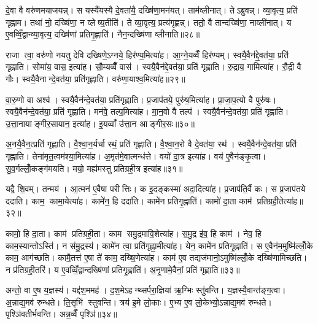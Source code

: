 दे॒वा वै वरु॑णमयाजयन्न्। स यस्यै॑यस्यै दे॒वता॑यै॒ दख्षि॑णा॒मन॑यत्। ताम॑व्लीनात्। तेऽब्रुवन्न्। व्या॒वृत्य॒ प्रति॑ गृह्णाम। तथा॑ नो॒ दख्षि॑णा॒ न व्लेष्य॒तीति॑। ते व्या॒वृत्य॒ प्रत्य॑गृह्णन्न्। ततो॒ वै तान्दख्षि॑णा॒ नाव्ली॑नात्। य ए॒वव्विँ॒द्वान्व्या॒वृत्य॒ दख्षि॑णां प्रतिगृ॒ह्णाति॑। नैन॒न्दख्षि॑णा व्लीनाति॥२८॥

राजा त्वा॒ वरु॑णो नयतु देवि दख्षिणे॒ऽग्नये॒ हिर॑ण्य॒मित्या॑ह। आ॒ग्ने॒यव्वैँ हिर॑ण्यम्। स्वयै॒वैन॑द्दे॒वत॑या॒ प्रति॑ गृह्णाति। सोमा॑य॒ वास॒ इत्या॑ह। सौ॒म्यव्वैँ वास॑। स्वयै॒वैन॑द्दे॒वत॑या॒ प्रति॑ गृह्णाति। रु॒द्राय॒ गामित्या॑ह। रौ॒द्री वै गौः। स्वयै॒वैनान्दे॒वत॑या॒ प्रति॑गृह्णाति। वरु॑णा॒याश्व॒मित्या॑ह॥२९॥

वा॒रु॒णो वा अश्व॑। स्वयै॒वैन॑न्दे॒वत॑या॒ प्रति॑गृह्णाति। प्र॒जाप॑तये॒ पुरु॑ष॒मित्या॑ह। प्रा॒जा॒प॒त्यो वै पुरु॑षः। स्वयै॒वैन॑न्दे॒वत॑या॒ प्रति॑ गृह्णाति। मन॑वे॒ तल्प॒मित्या॑ह। मा॒न॒वो वै तल्प॑। स्वयै॒वैन॑न्दे॒वत॑या॒ प्रति॑ गृह्णाति। उ॒त्ता॒नायाङ्गीर॒सायान॒ इत्या॑ह। इ॒यव्वाँ उ॑त्ता॒न आङ्गीर॒सः॥३०॥

अ॒नयै॒वैन॒त्प्रति॑ गृह्णाति। वै॒श्वा॒न॒र्यर्चा रथं॒ प्रति॑ गृह्णाति। वै॒श्वा॒न॒रो वै दे॒वत॑या॒ रथ॑। स्वयै॒वैन॑न्दे॒वत॑या॒ प्रति॑ गृह्णाति। तेना॑मृत॒त्वम॑श्या॒मित्या॑ह। अ॒मृत॑मे॒वात्मन्ध॑त्ते। वयो॑ दा॒त्र इत्या॑ह। वय॑ ए॒वैन॑ङ्कृ॒त्वा। सु॒व॒र्गल्लोँ॒कङ्ग॑मयति। मयो॒ मह्य॑मस्तु प्रतिग्रही॒त्र इत्या॑ह॥३१॥

यद्वै शि॒वम्। तन्मय॑। आ॒त्मन॑ ए॒वैषा परीत्तिः। क इ॒दङ्कस्मा॑ अदा॒दित्या॑ह। प्र॒जाप॑ति॒र्वै कः। स प्र॒जाप॑तये ददाति। काम॒ कामा॒येत्या॑ह। कामे॑न॒ हि ददा॑ति। कामे॑न प्रतिगृ॒ह्णाति॑। कामो॑ दा॒ता काम॑ प्रतिग्रही॒तेत्या॑ह॥३२॥

कामो॒ हि दा॒ता। काम॑ प्रतिग्रही॒ता। काम समु॒द्रमावि॒शेत्या॑ह। स॒मु॒द्र इ॑व॒ हि काम॑। नेव॒ हि काम॒स्यान्तोऽस्ति॑। न स॑मु॒द्रस्य॑। कामे॑न त्वा॒ प्रति॑गृह्णा॒मीत्या॑ह। येन॒ कामे॑न प्रतिगृ॒ह्णाति॑। स ए॒वैन॑म॒मुष्मि॑ल्लोँ॒के काम॒ आग॑च्छति। कामै॒तत्त॑ ए॒षा ते॑ काम॒ दख्षि॒णेत्या॑ह। काम॑ ए॒व तद्यज॑मानो॒ऽमुष्मि॑ल्लोँ॒के दख्षि॑णामिच्छति। न प्र॑तिग्रही॒तरि॑। य ए॒वव्विँ॒द्वान्दख्षि॑णां प्रतिगृ॒ह्णाति॑। अ॒नृ॒णामे॒वैनां॒ प्रति॑ गृह्णाति॥३३॥\anuvakamend[व्ली॒ना॒त्यश्व॒मित्या॑हाङ्गीर॒सः प्र॑तिग्रही॒त्र इत्या॑ह प्रतिग्रही॒तेत्या॑ह॒ दख्षि॒णेत्या॑ह च॒त्वारि॑ च]

अन्तो॒ वा ए॒ष य॒ज्ञस्य॑। यद्द॑श॒ममह॑। द॒श॒मेऽहन्थ्सर्परा॒ज्ञिया॑ ऋ॒ग्भिः स्तु॑वन्ति। य॒ज्ञस्यै॒वान्त॑ङ्ग॒त्वा। अ॒न्नाद्य॒मव॑ रुन्धते। ति॒सृभि॑ स्तुवन्ति। त्रय॑ इ॒मे लो॒काः। ए॒भ्य ए॒व लो॒केभ्यो॒ऽन्नाद्य॒मव॑ रुन्धते। पृश्ञि॑वतीर्भवन्ति। अन्न॒व्वैँ पृश्ञि॑॥३४॥

